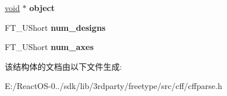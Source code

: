 \begin{DoxyCompactItemize}
\item 
\mbox{\label{struct_c_f_f___parser_rec___a33bc31ef366f1967ea9c0d96d5dd4147}} 
\hyperlink{interfacevoid}{void} $\ast$ {\bfseries object}
\item 
\mbox{\label{struct_c_f_f___parser_rec___a2681bc7697e3ff4756d70befb4da6e83}} 
F\+T\+\_\+\+U\+Short {\bfseries num\+\_\+designs}
\item 
\mbox{\label{struct_c_f_f___parser_rec___abb2e4e40679491bf26f5bc7e8f3bb653}} 
F\+T\+\_\+\+U\+Short {\bfseries num\+\_\+axes}
\end{DoxyCompactItemize}


该结构体的文档由以下文件生成\+:\begin{DoxyCompactItemize}
\item 
E\+:/\+React\+O\+S-\/0../sdk/lib/3rdparty/freetype/src/cff/cffparse.\+h\end{DoxyCompactItemize}
